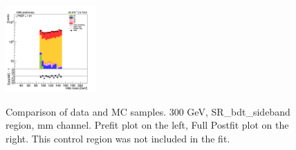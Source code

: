 \begin{figure}[tbp]
\begin{center}
    \includegraphics[width=0.31\textwidth]{figures/mm_300_april18/mm_300_good_SR_bdt_sideBand_april18/hmass1_mm_SR_FullPostfit_plot_apr18.png}\\
    \caption{Comparison of data and MC samples. 300 GeV, SR\_bdt\_sideband region, mm channel. Prefit plot on the left,           Full Postfit plot on the right. This control region was not included in the fit.}
    \label{fig:MCcomparisons_mm_low_SR_bdt_sideband}
  \end{center}
\end{figure}

